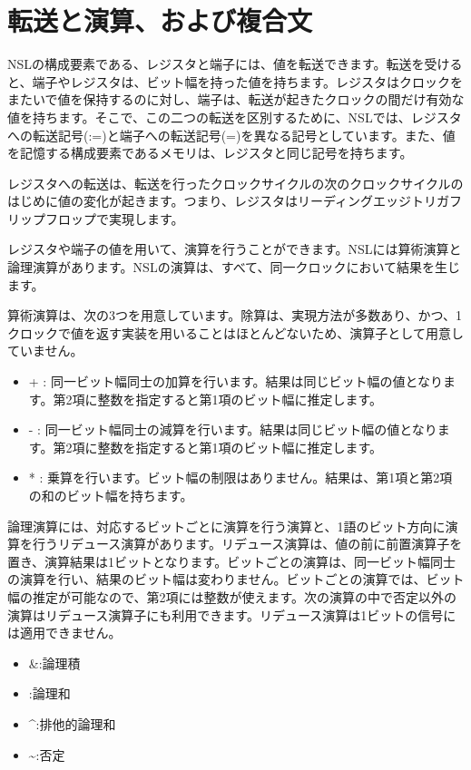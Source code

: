 \chapter{転送と演算、および複合文}
\label{chap:assignment}

NSLの構成要素である、レジスタと端子には、値を転送できます。転送を受けると、端子やレジスタは、ビット幅を持った値を持ちます。レジスタはクロックをまたいで値を保持するのに対し、端子は、転送が起きたクロックの間だけ有効な値を持ちます。そこで、この二つの転送を区別するために、NSLでは、レジスタへの転送記号(:=)と端子への転送記号(=)を異なる記号としています。また、値を記憶する構成要素であるメモリは、レジスタと同じ記号を持ちます。

レジスタへの転送は、転送を行ったクロックサイクルの次のクロックサイクルのはじめに値の変化が起きます。つまり、レジスタはリーディングエッジトリガフリップフロップで実現します。

レジスタや端子の値を用いて、演算を行うことができます。NSLには算術演算と論理演算があります。NSLの演算は、すべて、同一クロックにおいて結果を生じます。

算術演算は、次の3つを用意しています。除算は、実現方法が多数あり、かつ、1クロックで値を返す実装を用いることはほとんどないため、演算子として用意していません。

\begin{itemize}
\item + : 同一ビット幅同士の加算を行います。結果は同じビット幅の値となります。第2項に整数を指定すると第1項のビット幅に推定します。
\item - :  同一ビット幅同士の減算を行います。結果は同じビット幅の値となります。第2項に整数を指定すると第1項のビット幅に推定します。
\item * : 乗算を行います。ビット幅の制限はありません。結果は、第1項と第2項の和のビット幅を持ちます。
\end{itemize}

論理演算には、対応するビットごとに演算を行う演算と、1語のビット方向に演算を行うリデュース演算があります。リデュース演算は、値の前に前置演算子を置き、演算結果は1ビットとなります。ビットごとの演算は、同一ビット幅同士の演算を行い、結果のビット幅は変わりません。ビットごとの演算では、ビット幅の推定が可能なので、第2項には整数が使えます。次の演算の中で否定以外の演算はリデュース演算子にも利用できます。リデュース演算は1ビットの信号には適用できません。

\begin{itemize}
\item \&:論理積
\item \textbar{}:論理和
\item \textasciicircum{}:排他的論理和
\item \textasciitilde{}:否定
\end{itemize}

